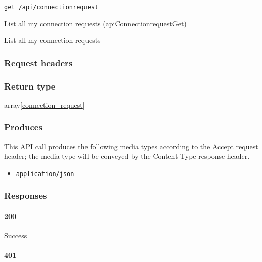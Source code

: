 \protect\hypertarget{apiConnectionrequestGet}{}{}

\begin{verbatim}
get /api/connectionrequest
\end{verbatim}

List all my connection requests ({apiConnectionrequestGet})

List all my connection requests

\hypertarget{request-headers-4}{%
\subsubsection{Request headers}\label{request-headers-4}}

\hypertarget{return-type-2}{%
\subsubsection{Return type}\label{return-type-2}}

array{[}\protect\hyperlink{connection_request}{connection\_request}{]}

\hypertarget{produces-4}{%
\subsubsection{Produces}\label{produces-4}}

This API call produces the following media types according to the
{Accept} request header; the media type will be conveyed by the
{Content-Type} response header.

\begin{itemize}
\tightlist
\item
  \texttt{application/json}
\end{itemize}

\hypertarget{responses-4}{%
\subsubsection{Responses}\label{responses-4}}

\hypertarget{section-12}{%
\paragraph{200}\label{section-12}}

Success

\hypertarget{section-13}{%
\paragraph{401}\label{section-13}}

